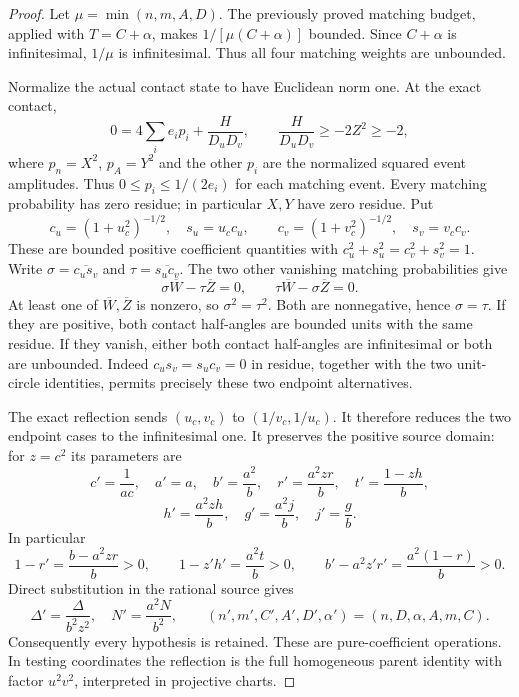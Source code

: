 \begin{proof}
Let $\mu=\min(n,m,A,D)$. The previously proved matching budget, applied
with $T=C+\alpha$, makes $1/[\mu(C+\alpha)]$ bounded. Since
$C+\alpha$ is infinitesimal, $1/\mu$ is infinitesimal. Thus all four
matching weights are unbounded.

Normalize the actual contact state to have Euclidean norm one. At the exact contact,
\[
 0=4\sum_i e_i p_i+\frac{H}{D_uD_v},\qquad
 \frac{H}{D_uD_v}\ge-2Z^2\ge-2,
\]
where $p_n=X^2$, $p_A=Y^2$ and the other $p_i$ are the normalized
squared event amplitudes. Thus $0\le p_i\le1/(2e_i)$ for each matching
event. Every matching probability has zero residue; in particular
$X,Y$ have zero residue.
Put
\[
 c_u=(1+u_c^2)^{-1/2},\quad s_u=u_c c_u,\qquad
 c_v=(1+v_c^2)^{-1/2},\quad s_v=v_c c_v.
\]
These are bounded positive coefficient quantities with
$c_u^2+s_u^2=c_v^2+s_v^2=1$. Write
$\sigma=\overline{c_us_v}$ and $\tau=\overline{s_uc_v}$.
The two other vanishing matching probabilities give
\[
 \sigma\overline W-\tau\overline Z=0,\qquad
 \tau\overline W-\sigma\overline Z=0.
\]
At least one of $\overline W,\overline Z$ is nonzero, so
$\sigma^2=\tau^2$. Both are nonnegative, hence $\sigma=\tau$.
If they are positive, both contact half-angles are bounded units with
the same residue. If they vanish, either both contact half-angles are
infinitesimal or both are unbounded. Indeed
$c_us_v=s_uc_v=0$ in residue, together with the two unit-circle
identities, permits precisely these two endpoint alternatives.

The exact reflection sends $(u_c,v_c)$ to $(1/v_c,1/u_c)$.
It therefore reduces the two endpoint cases to the infinitesimal one.
It preserves the positive source domain: for $z=c^2$ its parameters are
\[
 c'=\frac1{ac},\quad a'=a,\quad b'=\frac{a^2}{b},\quad
 r'=\frac{a^2zr}{b},\quad t'=\frac{1-zh}{b},
\]
\[
 h'=\frac{a^2zh}{b},\quad g'=\frac{a^2j}{b},\quad j'=\frac gb.
\]
In particular
\[
 1-r'=\frac{b-a^2zr}{b}>0,\qquad
 1-z'h'=\frac{a^2t}{b}>0,\qquad
 b'-a^2z'r'=\frac{a^2(1-r)}b>0.
\]
Direct substitution in the rational source gives
\[
 \Delta'=\frac{\Delta}{b^2z^2},\quad N'=\frac{a^2N}{b^2},\qquad
 (n',m',C',A',D',\alpha')=(n,D,\alpha,A,m,C).
\]
Consequently every hypothesis is retained. These are pure-coefficient
operations. In testing coordinates the reflection is the full homogeneous
parent identity with factor $u^2v^2$, interpreted in projective charts.


\end{proof}
